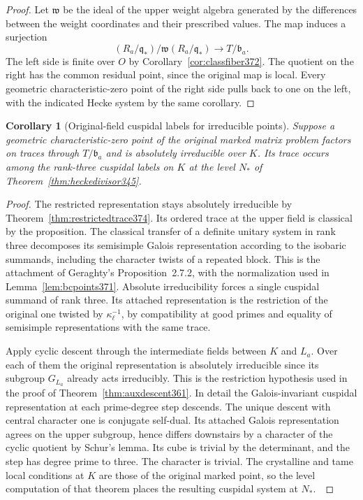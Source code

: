 \documentclass[a4paper,11pt]{article}
\newtheorem{corollary}[proposition]{Corollary}
\theoremstyle{definition}
\theoremstyle{remark}
\numberwithin{equation}{section}
\begin{document}
\begin{proof}
Let \(\mathfrak w\) be the ideal of the upper weight algebra
generated by the differences between the weight coordinates
and their prescribed values. The map induces a surjection
\[
        (R_a/\mathfrak q_*)/\mathfrak w(R_a/\mathfrak q_*)
                          \longrightarrow T/\mathfrak b_a .
\]
The left side is finite over \(O\) by
Corollary~\ref{cor:classfiber372}. The quotient on the
right has the common residual point, since the original map
is local. Every geometric characteristic-zero point of the
right side pulls back to one on the left, with the indicated
Hecke system by the same corollary.
\end{proof}

\begin{corollary}[Original-field cuspidal labels for irreducible points]
\label{cor:irreduciblelabel374}
Suppose a geometric characteristic-zero point of the original
marked matrix problem factors on traces through \(T/\mathfrak b_a\)
and is absolutely irreducible over \(K\). Its trace occurs
among the rank-three cuspidal labels on \(K\) at the level
\(N_*\) of Theorem~\ref{thm:heckedivisor345}.
\end{corollary}
\begin{proof}
The restricted representation stays absolutely irreducible
by Theorem~\ref{thm:restrictedtrace374}. Its ordered trace
at the upper field is classical by the proposition. The
classical transfer of a definite unitary system in rank three
decomposes its semisimple Galois representation according
to the isobaric summands, including the character twists
of a repeated block. This is the attachment of Geraghty's
Proposition~2.7.2, with the normalization used in
Lemma~\ref{lem:bcpoints371}. Absolute irreducibility forces
a single cuspidal summand of rank three. Its attached
representation is the restriction of the original one
twisted by \(\kappa_\ell^{-1}\), by compatibility at good
primes and equality of semisimple representations with the
same trace.~\cite{VII-V-geraghty363}

Apply cyclic descent through the intermediate fields
between \(K\) and \(L_a\). Over each of them the original
representation is absolutely irreducible since its subgroup
\(G_{L_a}\) already acts irreducibly. This is the restriction
hypothesis used in the proof of
Theorem~\ref{thm:auxdescent361}. In detail the Galois-invariant
cuspidal representation at each prime-degree step descends.
The unique descent with central character one is conjugate
self-dual. Its attached Galois representation agrees on the
upper subgroup, hence differs downstairs by a character of
the cyclic quotient by Schur's lemma. Its cube is trivial
by the determinant, and the step has degree prime to three.
The character is trivial. The crystalline and tame local
conditions at \(K\) are those of the original marked point,
so the level computation of that theorem places the resulting
cuspidal system at \(N_*\).~\cite{VII-V-I-ac123,VII-V-lgp361,VII-V-V-shin}
\end{proof}
\end{document}
